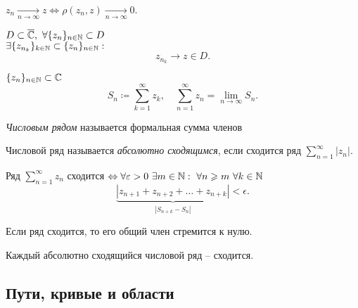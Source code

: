 \begin{note}
    $ z_n \xrightarrow[n \rightarrow \infty]{} z \iff \rho(z_n,z) \xrightarrow[n \rightarrow \infty]{} 0 $.
\end{note}

\begin{theorem}
    $ D \subset \overline{\mathbb{C}}, \ \forall \{z_n\}_{n\in\mathbb{N}}\subset D $ \\ $ \exists \{z_{n_k}\}_{k\in\mathbb{N}}\subset \{z_n\}_{n\in\mathbb{N}}: $
    \[
        z_{n_k} \longrightarrow z \in D.
    \]
\end{theorem}

\begin{note}
    $ \{z_n\}_{n\in\mathbb{N}} \subset \mathbb{C} $
    \[
        S_n \coloneqq \sum_{k=1}^{\infty}z_k, \quad \sum_{n=1}^{\infty}z_n = \underset{n \rightarrow\infty}{\lim} S_n.
    \]
\end{note}

\begin{definition}
    \emph{Числовым рядом} называется формальная сумма членов
\end{definition}

\begin{definition}
    Числовой ряд называется \emph{абсолютно сходящимся}, если сходится ряд $ \sum_{n=1}^{\infty}| z_n | $.
\end{definition}

\begin{theorem}
    Ряд $ \sum_{n=1}^{\infty} z_n $ сходится $ \iff \forall \epsilon > 0 \ \exists m \in \N: \ \forall n \geqslant m \ \forall k \in \N $
    \[
        \underbrace{| z_{n+1} + z_{n+2} + \ldots + z_{n+k} |}_{| S_{n+k} - S_n |} < \epsilon.
    \]
\end{theorem}

\begin{corollary}
    Если ряд сходится, то его общий член стремится к нулю.
\end{corollary}

\begin{corollary}
    Каждый абсолютно сходящийся числовой ряд -- сходится.
\end{corollary}

\subsection{Пути, кривые и области}

